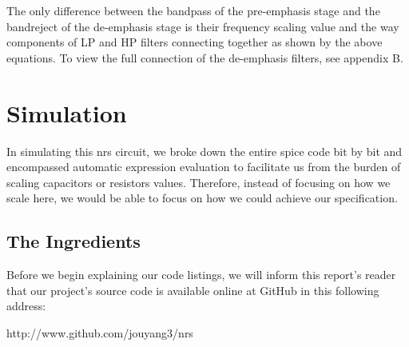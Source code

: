 \documentclass[report]{IEEEtran}
\begin{document}
			The only difference between the bandpass of the pre-emphasis stage and the bandreject of the de-emphasis stage is their frequency scaling value and the way components of LP and HP filters connecting together as shown by the above equations. To view the full connection of the de-emphasis filters, see appendix B.
		
	\section{Simulation}
		In simulating this nrs circuit, we broke down the entire spice code bit by bit and encompassed automatic expression evaluation to facilitate us from the burden of scaling capacitors or resistors values. Therefore, instead of focusing on how we scale here, we would be able to focus on how we could achieve our specification.
		
		\subsection{The Ingredients}
		Before we begin explaining our code listings, we will inform this report's reader that our project's source code is available online at GitHub in this following address:
		\begin{center}
			http://www.github.com/jouyang3/nrs
		\end{center}
		
\end{document}
